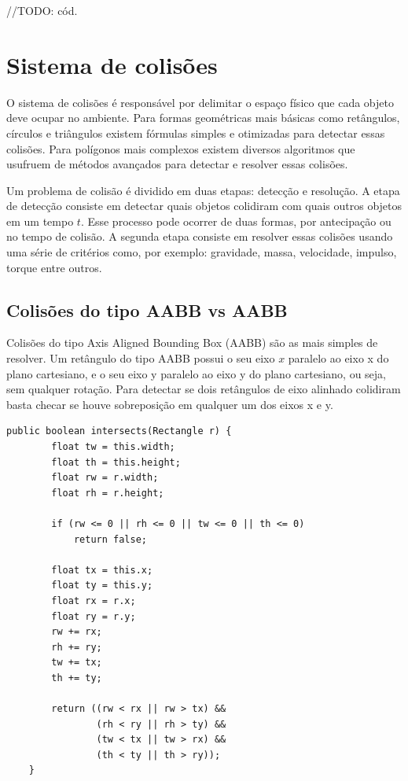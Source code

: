 \documentclass[12pt, 
openright, 
oneside, 
a4paper,    
brazil]{facom-ufu-abntex2}
\begin{document}
//TODO: cód.

\section{Sistema de colisões}

O sistema de colisões é responsável por delimitar o espaço físico que cada objeto deve ocupar no ambiente. Para formas geométricas mais básicas como retângulos, círculos e triângulos existem fórmulas simples e otimizadas para detectar essas colisões. Para polígonos mais complexos existem diversos algoritmos que usufruem de métodos avançados para detectar e resolver essas colisões.

Um problema de colisão é dividido em duas etapas: detecção e resolução. A etapa de detecção consiste em detectar quais objetos colidiram com quais outros objetos em um tempo $t$. Esse processo pode ocorrer de duas formas, por antecipação ou no tempo de colisão. A segunda etapa consiste em resolver essas colisões usando uma série de critérios como, por exemplo: gravidade, massa, velocidade, impulso, torque entre outros.

\subsection{Colisões do tipo AABB vs AABB}

Colisões do tipo Axis Aligned Bounding Box (AABB) são as mais simples de resolver. Um retângulo do tipo AABB possui o seu eixo $x$ paralelo ao eixo x do plano cartesiano, e o seu eixo y paralelo ao eixo y do plano cartesiano, ou seja, sem qualquer rotação. Para detectar se dois retângulos de eixo alinhado colidiram basta checar se houve sobreposição em qualquer um dos eixos x e y.

\begin{lstlisting}[caption=Colisão AABB vs AABB]
	public boolean intersects(Rectangle r) {
    	float tw = this.width;
        float th = this.height;
        float rw = r.width;
        float rh = r.height;
        
        if (rw <= 0 || rh <= 0 || tw <= 0 || th <= 0) 
            return false;
        
        float tx = this.x;
        float ty = this.y;
        float rx = r.x;
        float ry = r.y;
        rw += rx;
        rh += ry;
        tw += tx;
        th += ty;
      
        return ((rw < rx || rw > tx) && 
                (rh < ry || rh > ty) &&
                (tw < tx || tw > rx) && 
                (th < ty || th > ry)); 
    }
\end{lstlisting}
\end{document}
